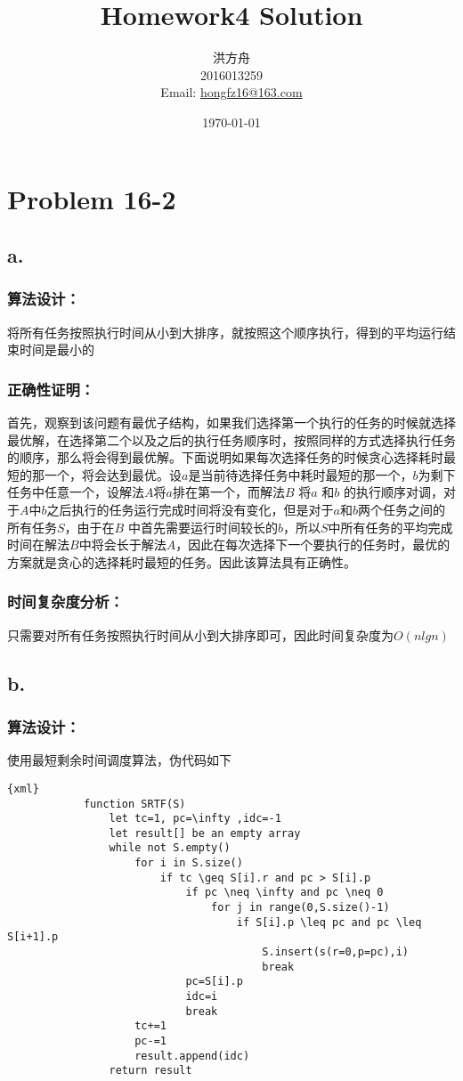 ﻿\documentclass{article}
\title{Homework4 Solution}
\author{洪方舟\\2016013259\\Email: \href{mailto:hongfz16@163.com}{hongfz16@163.com}}
\date{\today}
\begin{document}
  \maketitle
  \section*{Problem 16-2}
    \subsection*{a.}
        \subsubsection*{算法设计：}
            将所有任务按照执行时间从小到大排序，就按照这个顺序执行，得到的平均运行结束时间是最小的
        \subsubsection*{正确性证明：}
            首先，观察到该问题有最优子结构，如果我们选择第一个执行的任务的时候就选择最优解，在选择第二个以及之后的执行任务顺序时，按照同样的方式选择执行任务的顺序，那么将会得到最优解。下面说明如果每次选择任务的时候贪心选择耗时最短的那一个，将会达到最优。设$a$是当前待选择任务中耗时最短的那一个，$b$为剩下任务中任意一个，设解法$A$将$a$排在第一个，而解法$B$ 将$a$ 和$b$ 的执行顺序对调，对于$A$中$b$之后执行的任务运行完成时间将没有变化，但是对于$a$和$b$两个任务之间的所有任务$S$，由于在$B$ 中首先需要运行时间较长的$b$，所以$S$中所有任务的平均完成时间在解法$B$中将会长于解法$A$，因此在每次选择下一个要执行的任务时，最优的方案就是贪心的选择耗时最短的任务。因此该算法具有正确性。
        \subsubsection*{时间复杂度分析：}
            只需要对所有任务按照执行时间从小到大排序即可，因此时间复杂度为$O(nlgn)$
    \subsection*{b.}
        \subsubsection*{算法设计：}
            使用最短剩余时间调度算法，伪代码如下
            \begin{lstlisting}{xml}
            function SRTF(S)
                let tc=1, pc=\infty ,idc=-1
                let result[] be an empty array
                while not S.empty()
                    for i in S.size()
                        if tc \geq S[i].r and pc > S[i].p
                            if pc \neq \infty and pc \neq 0
                                for j in range(0,S.size()-1)
                                    if S[i].p \leq pc and pc \leq S[i+1].p
                                        S.insert(s(r=0,p=pc),i)
                                        break
                            pc=S[i].p
                            idc=i
                            break
                    tc+=1
                    pc-=1
                    result.append(idc)
                return result
            \end{lstlisting}
\end{document}
